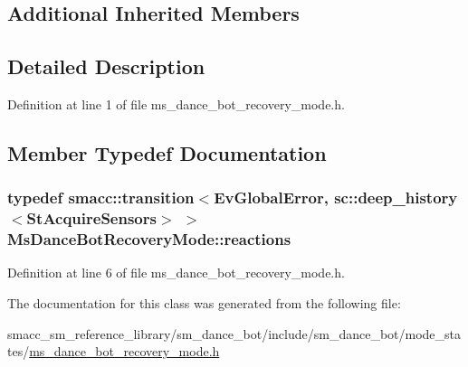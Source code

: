 \subsection*{Additional Inherited Members}


\subsection{Detailed Description}


Definition at line 1 of file ms\+\_\+dance\+\_\+bot\+\_\+recovery\+\_\+mode.\+h.



\subsection{Member Typedef Documentation}
\subsubsection[{\texorpdfstring{reactions}{reactions}}]{\setlength{\rightskip}{0pt plus 5cm}typedef {\bf smacc\+::transition}$<$Ev\+Global\+Error, sc\+::deep\+\_\+history$<${\bf St\+Acquire\+Sensors}$>$ $>$ {\bf Ms\+Dance\+Bot\+Recovery\+Mode\+::reactions}}\hypertarget{classMsDanceBotRecoveryMode_a0b9b9dd300d70cafd84b25b485370b78}{}\label{classMsDanceBotRecoveryMode_a0b9b9dd300d70cafd84b25b485370b78}


Definition at line 6 of file ms\+\_\+dance\+\_\+bot\+\_\+recovery\+\_\+mode.\+h.



The documentation for this class was generated from the following file\+:\begin{DoxyCompactItemize}
\item 
smacc\+\_\+sm\+\_\+reference\+\_\+library/sm\+\_\+dance\+\_\+bot/include/sm\+\_\+dance\+\_\+bot/mode\+\_\+states/\hyperlink{ms__dance__bot__recovery__mode_8h}{ms\+\_\+dance\+\_\+bot\+\_\+recovery\+\_\+mode.\+h}\end{DoxyCompactItemize}
